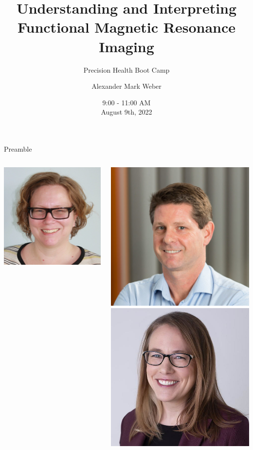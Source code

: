\documentclass[aspectratio=169,xcolor=dvipsnames]{beamer}
\title[Functional MRI: Part 1 of 2]{Understanding and Interpreting \\Functional Magnetic Resonance Imaging}
\subtitle{Precision Health Boot Camp}
\author[Dr. Alexander Mark Weber] {Alexander Mark Weber}
\institute[UBC] %
{
    Department of Pediatrics, Division of Neurology \\
    University of British Columbia 
    \vskip 3pt
}
\date{9:00 - 11:00 AM \\August 9th, 2022} %
\begin{document}
\begin{frame}
    \titlepage
\end{frame}

\begin{frame}{Preamble}

\begin{columns}[c]
\begin{center}
\includegraphics[width=.7\textwidth]{imgs/Lynne}
\end{center}

\includegraphics[width=.5\textwidth]{imgs/todd}%
\includegraphics[width=.5\textwidth]{imgs/tammy}


\end{columns}
\end{frame}
\end{document}
